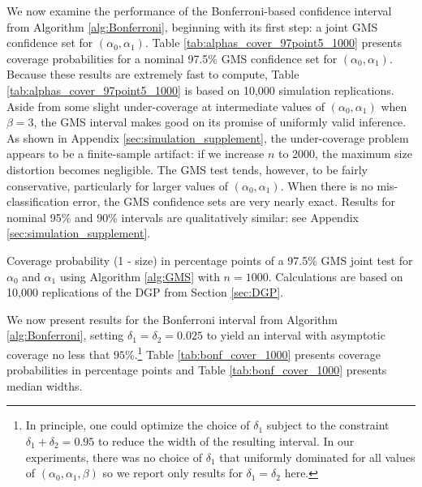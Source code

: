 We now examine the performance of the Bonferroni-based confidence interval from Algorithm \ref{alg:Bonferroni}, beginning with its first step: a joint GMS confidence set for $(\alpha_0, \alpha_1)$.
Table \ref{tab:alphas_cover_97point5_1000} presents coverage probabilities for a nominal 97.5\% GMS confidence set for $(\alpha_0, \alpha_1)$.
Because these results are extremely fast to compute, Table \ref{tab:alphas_cover_97point5_1000} is based on 10,000 simulation replications. 
Aside from some slight under-coverage at intermediate values of $(\alpha_0, \alpha_1)$ when $\beta = 3$, the GMS interval makes good on its promise of uniformly valid inference.
As shown in Appendix \ref{sec:simulation_supplement}, the under-coverage problem appears to be a finite-sample artifact: if we increase $n$ to 2000, the maximum size distortion becomes negligible.
The GMS test tends, however, to be fairly conservative, particularly for larger values of $(\alpha_0, \alpha_1)$.
When there is no mis-classification error, the GMS confidence sets are very nearly exact.
Results for nominal 95\% and 90\% intervals are qualitatively similar: see Appendix \ref{sec:simulation_supplement}.

\begin{table}
  \small
  \centering
  
  \caption{Coverage probability (1 - size) in percentage points of a 97.5\% GMS joint test for $\alpha_0$ and $\alpha_1$ using Algorithm \ref{alg:GMS} with $n = 1000$. Calculations are based on 10,000 replications of the DGP from Section \ref{sec:DGP}.}
  \label{tab:alphas_cover_97point5_1000}
\end{table}

We now present results for the Bonferroni interval from Algorithm \ref{alg:Bonferroni}, setting $\delta_1 = \delta_2 = 0.025$ to yield an interval with asymptotic coverage no less that $95\%$.\footnote{In principle, one could optimize the choice of $\delta_1$ subject to the constraint $\delta_1 + \delta_2 = 0.95$ to reduce the width of the resulting interval. In our experiments, there was no choice of $\delta_1$ that uniformly dominated for all values of $(\alpha_0, \alpha_1, \beta)$ so we report only results for $\delta_1 = \delta_2$ here.}
Table \ref{tab:bonf_cover_1000} presents coverage probabilities in percentage points and Table \ref{tab:bonf_cover_1000} presents median widths.

